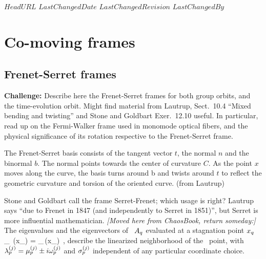 \ifsvnmulti
 \svnidlong
 {$HeadURL$}
 {$LastChangedDate$}
 {$LastChangedRevision$} {$LastChangedBy$}
\fi

\renewcommand{\ssp}{x}            %

\section{Co-moving frames}
\label{c:comoving}


\subsection{Frenet-Serret frames}
\label{sect:FrenSerr}

\textbf{Challenge:}
Describe here the Frenet-Serret  frames for both group orbits, and
the time-evolution orbit. Might find material from Lautrup,
Sect.~10.4 ``Mixed bending and twisting'' and Stone and
Goldbart Exer.~12.10 useful. In particular, read up on the
Fermi-Walker frame used in monomode optical fibers, and the physical
significance of its rotation respective to the Frenet-Serret frame.

{}{
The Frenet-Serret basis consists of the tangent vector $t$, the normal
$n$ and the binormal $b$. The normal points towards the center of
curvature $C$. As the point $x$ moves along the curve, the basis turns
around b and twists around $t$ to reflect the geometric curvature and
torsion of the oriented curve.
(from Lautrup)
}{}

Stone and Goldbart call the frame Serret-Frenet; which usage is right?
Lautrup says ``due to Frenet in 1847 (and independently to Serret in
1851)'', but Serret is more influential mathematician.
                                    \toCB
\emph{[Moved here from ChaosBook, return someday:]}
The eigenvalues and the eigen\-vectors of \stabmat\  ${A}_q$
evaluated at a stagnation point $\ssp_\stagn$
\beq
{\Mvar}_\stagn \, \jEigvec[j](\ssp_\stagn)
   = \eigExp[j]_\stagn \,\jEigvec[j] (\ssp_\stagn)
\,,
describe the linearized neighborhood of the \eqv\ point, with
$\eigExp[j]_p = \eigRe[j]_p \pm i\eigIm[j]_p$ and $\sigma_{p}^{(j)}$
independent of any particular coordinate choice.


